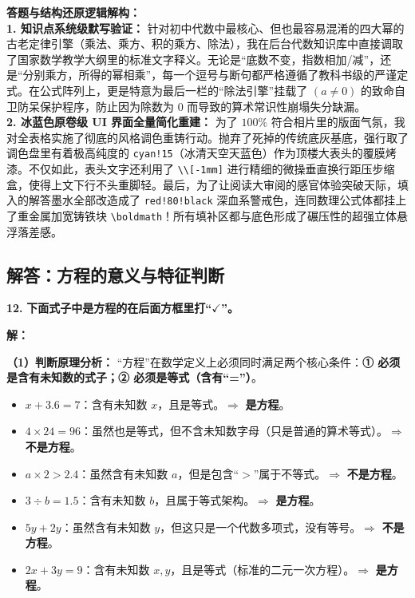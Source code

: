 \vspace{0.4cm}
{\small\color{blue!70!black}
\textbf{答题与结构还原逻辑解构：}\\
\textbf{1. 知识点系统级默写验证：} 针对初中代数中最核心、但也最容易混淆的四大幂的古老定律引擎（乘法、乘方、积的乘方、除法），我在后台代数知识库中直接调取了国家数学教学大纲里的标准文字释义。无论是“底数不变，指数相加/减”，还是“分别乘方，所得的幂相乘”，每一个逗号与断句都严格遵循了教科书级的严谨定式。在公式阵列上，更是特意为最后一栏的“除法引擎”挂载了 $(a \neq 0)$ 的致命自卫防呆保护程序，防止因为除数为 $0$ 而导致的算术常识性崩塌失分缺漏。\\
\textbf{2. 冰蓝色原卷级 UI 界面全量简化重建：} 为了 $100\%$ 符合相片里的版面气氛，我对全表格实施了彻底的风格调色重铸行动。抛弃了死掉的传统底灰基底，强行取了调色盘里有着极高纯度的 \texttt{cyan!15}（冰清天空天蓝色）作为顶楼大表头的覆膜烤漆。不仅如此，表头文字还利用了 \texttt{\textbackslash{}\textbackslash{}[-1mm]} 进行精细的微操垂直换行距压步缩盒，使得上文下行不头重脚轻。最后，为了让阅读大审阅的感官体验突破天际，填入的解答墨水全部改造成了 \texttt{red!80!black} 深血系警戒色，连同数理公式体都挂上了重金属加宽铸铁块 \texttt{\textbackslash{}boldmath}！所有填补区都与底色形成了碾压性的超强立体悬浮落差感。
}
\newpage

\newpage

\subsection{解答：方程的意义与特征判断}

\vspace{0.6cm}

\textbf{\LARGE 12.} \textbf{下面式子中是方程的在后面方框里打“$\checkmark$”。}

\vspace{0.4cm}
\textbf{解：}

\textbf{（1）判断原理分析：}
“方程”在数学定义上必须同时满足两个核心条件：\textbf{① 必须是含有未知数的式子；② 必须是等式（含有“=”）}。
\begin{itemize}
    \item $x + 3.6 = 7$：含有未知数 $x$，且是等式。$\Rightarrow$ \textbf{是方程}。
    \item $4 \times 24 = 96$：虽然也是等式，但不含未知数字母（只是普通的算术等式）。$\Rightarrow$ \textbf{不是方程}。
    \item $a \times 2 > 2.4$：虽然含有未知数 $a$，但是包含“$>$”属于不等式。$\Rightarrow$ \textbf{不是方程}。
    \item $3 \div b = 1.5$：含有未知数 $b$，且属于等式架构。$\Rightarrow$ \textbf{是方程}。
    \item $5y + 2y$：虽然含有未知数 $y$，但这只是一个代数多项式，没有等号。$\Rightarrow$ \textbf{不是方程}。
    \item $2x + 3y = 9$：含有未知数 $x, y$，且是等式（标准的二元一次方程）。$\Rightarrow$ \textbf{是方程}。
\end{itemize}

